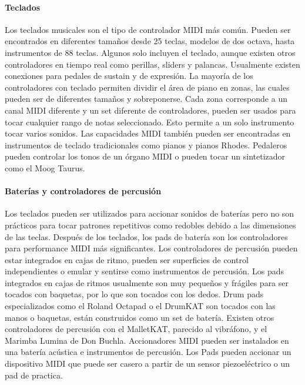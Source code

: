 \documentclass[a4paper,11pt,oneside]{book}
\begin{document}
\paragraph{Teclados}


Los teclados musicales son el tipo de controlador MIDI más común. Pueden ser encontrados en diferentes tamaños desde 25 teclas, modelos de dos octava, hasta instrumentos de 88 teclas. Algunos solo incluyen el teclado, aunque existen otros controladores en tiempo real como perillas, sliders y palancas. Usualmente existen conexiones para pedales de sustain y de expresión. La mayoría de los controladores con teclado permiten dividir el área de piano en zonas, las cuales pueden ser de diferentes tamaños y sobreponerse. Cada zona corresponde a un canal MIDI diferente y un set diferente de controladores, pueden ser usados para tocar cualquier rango de notas seleccionado. Esto permite a un solo instrumento tocar varios sonidos. Las capacidades MIDI también pueden ser encontradas en instrumentos de teclado tradicionales como pianos y pianos Rhodes. Pedaleros pueden controlar los tonos de un órgano MIDI o pueden tocar un sintetizador como el Moog Taurus.


\paragraph{Baterías y controladores de percusión}


Los teclados pueden ser utilizados para accionar sonidos de baterías pero no son prácticos para tocar patrones repetitivos como redobles debido a las dimensiones de las teclas. Después de los teclados, los pads de batería son los controladores para performance MIDI más significantes. Los controladores de percusión pueden estar integrados en cajas de ritmo, pueden ser superficies de control independientes o emular y sentirse como instrumentos de percusión. Los pads integrados en cajas de ritmos usualmente son muy pequeños y frágiles para ser tocados con baquetas, por lo que son tocados con los dedos. Drum pads especializados como el Roland Octapad o el DrumKAT son tocados con las manos o baquetas, están construidos como un set de batería. Existen otros controladores de percusión con el MalletKAT, parecido al vibráfono, y el Marimba Lumina de Don Buchla. Accionadores MIDI pueden ser instalados en una batería acústica e instrumentos de percusión. Los \gls{Pads} pueden accionar un dispositivo MIDI que puede ser casero a partir de un sensor piezoeléctrico o un pad de practica.
\end{document}
